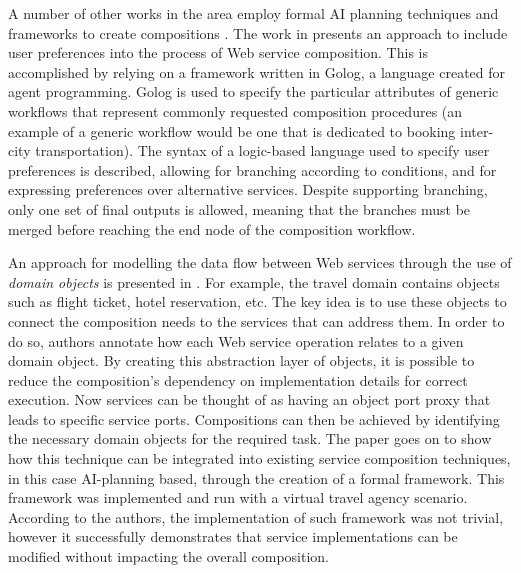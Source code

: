 A number of other works in the area employ formal AI planning techniques and frameworks to create compositions \cite{bertoli2009control}. The work in \cite{sohrabi2009web} presents an approach to include user preferences into the process of Web service composition. This is accomplished by relying on a framework written in Golog, a language created for agent programming. Golog is used to specify the particular attributes of generic workflows that represent commonly requested composition procedures (an example of a generic workflow would be one that is dedicated to booking inter-city transportation). The syntax of a logic-based language used to specify user preferences is described, allowing for branching according to conditions, and for expressing preferences over alternative services. Despite supporting branching, only one set of final outputs is allowed, meaning that the branches must be merged before reaching the end node of the composition workflow.

An approach for modelling the data flow between Web services through the use of \textit{domain objects} is presented in \cite{kazhamiakin2013data}. For example, the travel domain contains objects such as flight ticket, hotel reservation, etc. The key idea is to use these objects to connect the composition needs to the services that can address them. In order to do so, authors annotate how each Web service operation relates to a given domain object. By creating this abstraction layer of objects, it is possible to reduce the composition's dependency on implementation details for correct execution. Now services can be thought of as having an object port proxy that leads to specific service ports. Compositions can then
be achieved by identifying the necessary domain objects for the required task. The paper goes on to show how this technique can be integrated into existing service composition techniques, in this case AI-planning based, through the creation of a formal framework. This framework was implemented and run with a virtual travel agency scenario. According to the authors, the implementation of such framework was not trivial, however it successfully demonstrates that service implementations can be modified without impacting the overall composition.

